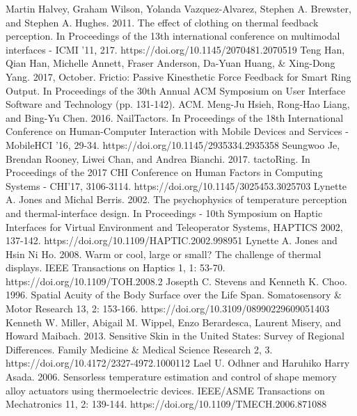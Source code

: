 \documentclass[preprint,12pt]{elsarticle}
\begin{document}
\begin{thebibliography}{00}
Martin Halvey, Graham Wilson, Yolanda Vazquez-Alvarez, Stephen A. Brewster, and Stephen A. Hughes. 2011. The effect of clothing on thermal feedback perception. In Proceedings of the 13th international conference on multimodal interfaces - ICMI '11, 217. https://doi.org/10.1145/2070481.2070519
Teng Han, Qian Han, Michelle Annett, Fraser Anderson, Da-Yuan Huang, \& Xing-Dong Yang. 2017, October. Frictio: Passive Kinesthetic Force Feedback for Smart Ring Output. In Proceedings of the 30th Annual ACM Symposium on User Interface Software and Technology (pp. 131-142). ACM.
Meng-Ju Hsieh, Rong-Hao Liang, and Bing-Yu Chen. 2016. NailTactors. In Proceedings of the 18th International Conference on Human-Computer Interaction with Mobile Devices and Services - MobileHCI '16, 29-34. https://doi.org/10.1145/2935334.2935358
Seungwoo Je, Brendan Rooney, Liwei Chan, and Andrea Bianchi. 2017. tactoRing. In Proceedings of the 2017 CHI Conference on Human Factors in Computing Systems - CHI'17, 3106-3114. https://doi.org/10.1145/3025453.3025703
Lynette A. Jones and Michal Berris. 2002. The psychophysics of temperature perception and thermal-interface design. In Proceedings - 10th Symposium on Haptic Interfaces for Virtual Environment and Teleoperator Systems, HAPTICS 2002, 137-142. https://doi.org/10.1109/HAPTIC.2002.998951
Lynette A. Jones and Hsin Ni Ho. 2008. Warm or cool, large or small? The challenge of thermal displays. IEEE Transactions on Haptics 1, 1: 53-70. https://doi.org/10.1109/TOH.2008.2
Josepth C. Stevens and Kenneth K. Choo. 1996. Spatial Acuity of the Body Surface over the Life Span. Somatosensory \& Motor Research 13, 2: 153-166. https://doi.org/10.3109/08990229609051403
Kenneth W. Miller, Abigail M. Wippel, Enzo Berardesca, Laurent Misery, and Howard Maibach. 2013. Sensitive Skin in the United States: Survey of Regional Differences. Family Medicine \& Medical Science Research 2, 3. https://doi.org/10.4172/2327-4972.1000112
Lael U. Odhner and Haruhiko Harry Asada. 2006. Sensorless temperature estimation and control of shape memory alloy actuators using thermoelectric devices. IEEE/ASME Transactions on Mechatronics 11, 2: 139-144. https://doi.org/10.1109/TMECH.2006.871088

\end{thebibliography}
\end{document}
